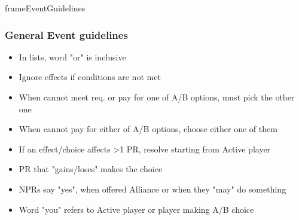 \documentclass[10pt]{article}
\newlength{\fhEventGuidelines} \setlength\fhEventGuidelines{35\baselineskip}
\begin{document}
\begin{dynamiccontents*}{frameEventGuidelines}\begin{eubox}{\fhEventGuidelines}
	\begin{multicols}{2}
		\subsubsection*{General Event guidelines }
		\begin{itemize}
			\item In lists, word "or" is inclusive
			\item Ignore effects if conditions are not met
			\item When cannot meet req. or pay for one of A/B options, must pick the other one
			\item When cannot pay for either of A/B options, choose either one of them
			\item If an effect/choice affects >1 PR, resolve starting from Active player
			\item PR that "gains/loses" makes the choice
			\item NPRs say "yes", when offered Alliance or when they "may" do something
			\item Word "you" refers to Active player or player making A/B choice
		\end{itemize}
		

\end{multicols}
\end{eubox}
\end{dynamiccontents*}
\end{document}
